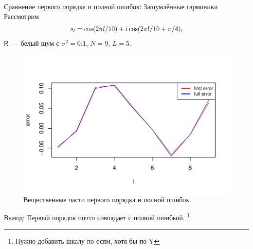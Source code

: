 \documentclass[ucs, notheorems, handout]{beamer}
\newcommand{\tX}[1]{\mathsf{#1}}
\newcommand{\iu}{\mathrm{i}\mkern1mu}
\begin{document}

\begin{frame}{Сравнение первого порядка и полной ошибок: Зашумлённые гармоники}
Рассмотрим
$$s_l = \cos(2 \pi l / 10) + \iu\cos(2 \pi l / 10 + \pi/4),$$
$\tX{R}$~--- белый шум с $\sigma^2 = 0.1$, $N = 9$, $L = 5$.
\begin{figure}[H]
	\begin{center}
		\includegraphics[width=0.6\linewidth]{img/first_vs_full_re.pdf}
		\caption{Вещественные части первого порядка и полной ошибок.}
		\label{fig:harm_noise}
	\end{center}
\end{figure}
\alert{Вывод:} Первый порядок почти совпадает с полной ошибкой.
\footnote{Нужно добавить шкалу по осям, хотя бы по Y}
\end{frame}
\end{document}
